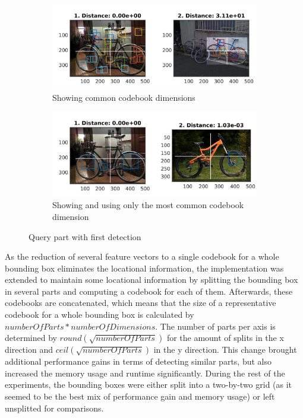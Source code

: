 \begin{figure}
\centering
\begin{subfigure}{\textwidth}
\includegraphics[width=\linewidth]{images/codebook_similiar2}
\caption{Showing common codebook dimensions}
\label{fig:nn_query_search2:common}
\end{subfigure}
\begin{subfigure}{\textwidth}
\includegraphics[width=\linewidth]{images/codebook_similiar_best2}
\caption{Showing and using only the most common codebook dimension}
\label{fig:nn_query_search2:best}
\end{subfigure}
\caption{Query part with first detection}
\label{fig:nn_query_search2}
\end{figure}

\par
As the reduction of several feature vectors to a single codebook for a whole bounding box eliminates the locational information, the implementation was extended to maintain some locational information by splitting the bounding box in several parts and computing a codebook for each of them. Afterwards, these codebooks are concatenated, which means that the size of a representative codebook for a whole bounding box is calculated by $numberOfParts * numberOfDimensions$. The number of parts per axis is determined by $round(\sqrt{numberOfParts})$ for the amount of splits in the x direction and $ceil(\sqrt{numberOfParts})$ in the y direction. This change brought additional performance gains in terms of detecting similar parts, but also increased the memory usage and runtime significantly. During the rest of the experiments, the bounding boxes were either split into a two-by-two grid (as it seemed to be the best mix of performance gain and memory usage) or left unsplitted for comparisons.

